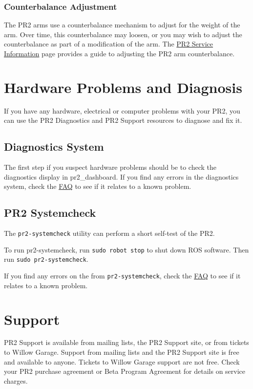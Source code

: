 \subsubsection{Counterbalance Adjustment}

The PR2 arms use a counterbalance mechanism to adjust for the weight of the arm. Over time, this counterbalance may loosen, or you may wish to adjust the counterbalance as part of a modification of the arm. The \href{http://pr2support.willowgarage.com/wiki/PR2 Service Information}{PR2 Service Information} page provides a guide to adjusting the PR2 arm counterbalance.

\section{Hardware Problems and Diagnosis}

If you have any hardware, electrical or computer problems with your PR2, you can use the PR2 Diagnostics and PR2 Support resources to diagnose and fix it.

\subsection{Diagnostics System}

The first step if you suspect hardware problems should be to check the diagnostics display in pr2\_dashboard. If you find any errors in the diagnostics system, check the \href{http://pr2support.willowgarage.com/wiki/FAQ}{FAQ} to see if it relates to a known problem.

\subsection{PR2 Systemcheck}

The \texttt{pr2-systemcheck} utility can perform a short self-test of the PR2. 

To run pr2-systemcheck, run \texttt{sudo robot stop} to shut down ROS software. Then run \texttt{sudo pr2-systemcheck}.

If you find any errors on the from \texttt{pr2-systemcheck}, check the \href{http://pr2support.willowgarage.com/wiki/FAQ}{FAQ} to see if it relates to a known problem.

\section{Support}

PR2 Support is available from mailing lists, the PR2 Support site, or from tickets to Willow Garage. Support from mailing lists and the PR2 Support site is free and available to anyone. Tickets to Willow Garage support are not free. Check your PR2 purchase agreement or Beta Program Agreement for details on service charges.

